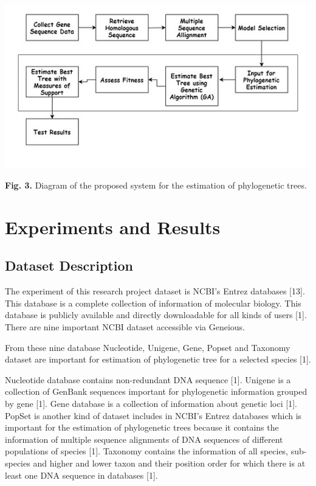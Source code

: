 \documentclass[preprint,12pt]{elsarticle}
\begin{document}
\begin{center}
\includegraphics{FIG03.jpg}

\textbf{Fig. 3.} Diagram of the proposed system for the estimation of phylogenetic trees.
\end{center}
\section{Experiments and Results}

	\subsection{Dataset Description}
    The experiment of this research project dataset is NCBI's Entrez databases [13]. This database is a complete collection of information of molecular biology. This database is publicly available and directly downloadable for all kinds of users [1]. There are nine important NCBI dataset accessible via Geneious.

From these nine database Nucleotide, Unigene, Gene, Popset and Taxonomy dataset are important for estimation of phylogenetic tree for a selected species [1]. 


Nucleotide database contains non-redundant DNA sequence [1]. Unigene is a collection of GenBank sequences important for phylogenetic information grouped by gene [1]. Gene database is a collection of information about genetic loci [1]. PopSet is another kind of dataset includes in NCBI's Entrez databases which is important for the estimation of phylogenetic trees because it contains the information of multiple sequence alignments of DNA sequences of different populations of species [1]. Taxonomy contains the information of all species, sub-species and higher and lower taxon and their position order for which there is at least one DNA sequence in databases [1].
\end{document}
